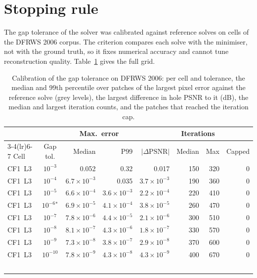 \documentclass[11pt]{article}
\begin{document}
\section{Stopping rule}
\label{sec:supp:calibration}

The gap tolerance of the solver was calibrated against reference solves on cells
of the DFRWS 2006 corpus. The criterion
compares each solve with the minimiser, not with the ground truth, so it fixes
numerical accuracy and cannot tune reconstruction quality.
Table~\ref{tab:supp:calibration} gives the full grid.

\begin{table}[htbp]
\centering
\caption{Calibration of the gap tolerance on DFRWS 2006: per cell and tolerance, the median and 99th percentile over patches of the largest pixel error against the reference solve (grey levels), the largest difference in hole PSNR to it (dB), the median and largest iteration counts, and the patches that reached the iteration cap.}
\label{tab:supp:calibration}
\footnotesize
\begin{tabular}{@{}l c r r r r r r@{}}
\toprule
 & & \multicolumn{2}{c}{Max.\ error} & & \multicolumn{2}{c}{Iterations} & \\
\cmidrule(lr){3-4}\cmidrule(lr){6-7}
Cell & Gap tol. & Median & P99 & $|\Delta\mathrm{PSNR}|$ & Median & Max & Capped \\
\midrule
CF1~L3 & $10^{-3}$ & 0.052 & 0.32 & 0.017 & 150 & 320 & 0 \\
CF1~L3 & $10^{-4}$ & $6.7 \times 10^{-3}$ & 0.035 & $3.7 \times 10^{-3}$ & 190 & 360 & 0 \\
CF1~L3 & $10^{-5}$ & $6.6 \times 10^{-4}$ & $3.6 \times 10^{-3}$ & $2.2 \times 10^{-4}$ & 220 & 410 & 0 \\
CF1~L3 & $10^{-6}$$^{*}$ & $6.9 \times 10^{-5}$ & $4.1 \times 10^{-4}$ & $3.8 \times 10^{-5}$ & 260 & 470 & 0 \\
CF1~L3 & $10^{-7}$ & $7.8 \times 10^{-6}$ & $4.4 \times 10^{-5}$ & $2.1 \times 10^{-6}$ & 300 & 510 & 0 \\
CF1~L3 & $10^{-8}$ & $8.1 \times 10^{-7}$ & $4.3 \times 10^{-6}$ & $1.8 \times 10^{-7}$ & 330 & 570 & 0 \\
CF1~L3 & $10^{-9}$ & $7.3 \times 10^{-8}$ & $3.8 \times 10^{-7}$ & $2.9 \times 10^{-8}$ & 370 & 600 & 0 \\
CF1~L3 & $10^{-10}$ & $7.8 \times 10^{-9}$ & $4.3 \times 10^{-8}$ & $4.3 \times 10^{-9}$ & 400 & 670 & 0 \\
$$
\end{tabular}
\end{table}
\end{document}
